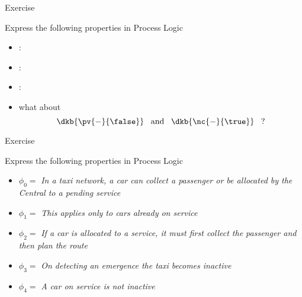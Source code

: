 \documentclass{beamer}
\begin{document}
\begin{slide}{\red Exercise}\label{s:25}
\small
\begin{block}{Express the following properties in Process Logic}
\begin{itemize}
\item {}: 
\item {}: \dkb{$\pv{-}{\true}$}
\item {}: \dkb{$\nc{-}{\false}$}
\item what about
\begin{equation*}
\dkb{\pv{-}{\false}}\; \; \; \text{and}\; \; \;  \dkb{\nc{-}{\true}}\; \; \; \text{?}
\end{equation*}
 \end{itemize}
 \end{block}
\end{slide}




\begin{slide}{\red Exercise}\label{s:26}
\small
\begin{block}{Express the following properties in Process Logic}
\begin{itemize}
\item $\phi_0 =$ \emph{In a taxi network, a car can collect a passenger or be allocated by the Central to a pending service}
\item $\phi_1 =$ \emph{This applies only to cars already on service}
\item $\phi_2 =$
 \emph{If a car is allocated to a service, it must first collect the passenger and then plan the route}
\item $\phi_3 =$ \emph{On detecting an emergence the taxi becomes inactive}
\item $\phi_4 =$ \emph{A car on service is not inactive}
\end{itemize}
\end{block}
\end{slide}
\end{document}

